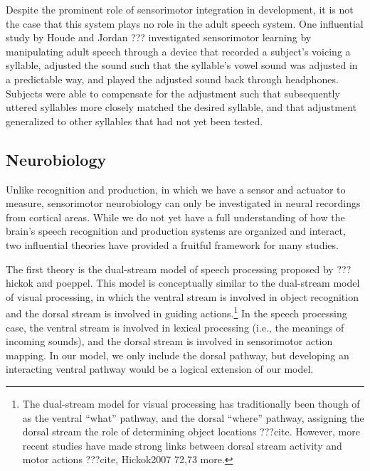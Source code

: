 Despite the prominent role of sensorimotor integration
in development,
it is not the case that this system
plays no role in the adult speech system.
One influential study by Houde and Jordan ???
investigated sensorimotor learning
by manipulating adult speech
through a device that recorded
a subject's voicing a syllable,
adjusted the sound such that the syllable's vowel sound
was adjusted in a predictable way,
and played the adjusted sound back through headphones.
Subjects were able to compensate
for the adjustment such that
subsequently uttered syllables
more closely matched the desired syllable,
and that adjustment generalized
to other syllables that had not yet
been tested.

\subsection{Neurobiology}

Unlike recognition and production,
in which we have a sensor and actuator to measure,
sensorimotor neurobiology
can only be investigated
in neural recordings from cortical areas.
While we do not yet
have a full understanding of
how the brain's speech recognition
and production systems are organized
and interact,
two influential theories have provided
a fruitful framework for many studies.

The first theory
is the dual-stream model of speech processing
proposed by ??? hickok and poeppel.
This model is conceptually similar
to the dual-stream model of visual processing,
in which the ventral stream
is involved in object recognition
and the dorsal stream is involved
in guiding actions.\footnote{The dual-stream
  model for visual processing has traditionally
  been though of as the ventral ``what'' pathway,
  and the dorsal ``where'' pathway,
  assigning the dorsal stream
  the role of determining object locations
  ???cite.
  However, more recent studies have made
  strong links between dorsal stream
  activity and motor actions ???cite, Hickok2007 72,73
  more.}
In the speech processing case,
the ventral stream
is involved in lexical processing
(i.e., the meanings of incoming sounds),
and the dorsal stream
is involved in sensorimotor action mapping.
In our model, we only include
the dorsal pathway,
but developing an
interacting ventral pathway
would be a logical extension of our model.

